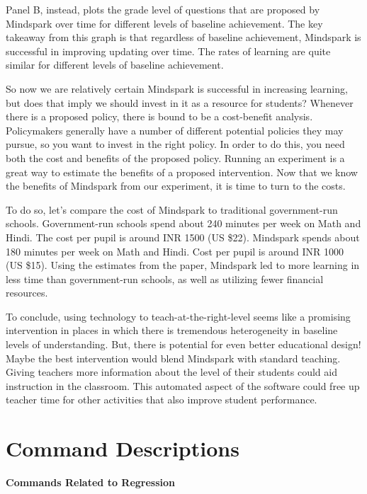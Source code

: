 \documentclass[
]{book}
\begin{document}
Panel B, instead, plots the grade level of questions that are proposed by Mindspark over time for different levels of baseline achievement. The key takeaway from this graph is that regardless of baseline achievement, Mindspark is successful in improving updating over time. The rates of learning are quite similar for different levels of baseline achievement.

So now we are relatively certain Mindspark is successful in increasing learning, but does that imply we should invest in it as a resource for students? Whenever there is a proposed policy, there is bound to be a cost-benefit analysis. Policymakers generally have a number of different potential policies they may pursue, so you want to invest in the right policy. In order to do this, you need both the cost and benefits of the proposed policy. Running an experiment is a great way to estimate the benefits of a proposed intervention. Now that we know the benefits of Mindspark from our experiment, it is time to turn to the costs.

To do so, let's compare the cost of Mindspark to traditional government-run schools. Government-run schools spend about 240 minutes per week on Math and Hindi. The cost per pupil is around INR 1500 (US \$22). Mindspark spends about 180 minutes per week on Math and Hindi. Cost per pupil is around INR 1000 (US \$15). Using the estimates from the paper, Mindspark led to more learning in less time than government-run schools, as well as utilizing fewer financial resources.

To conclude, using technology to teach-at-the-right-level seems like a promising intervention in places in which there is tremendous heterogeneity in baseline levels of understanding. But, there is potential for even better educational design! Maybe the best intervention would blend Mindspark with standard teaching. Giving teachers more information about the level of their students could aid instruction in the classroom. This automated aspect of the software could free up teacher time for other activities that also improve student performance.

\section*{Command Descriptions}\label{command-descriptions-1}

\textbf{Commands Related to Regression}
\end{document}
